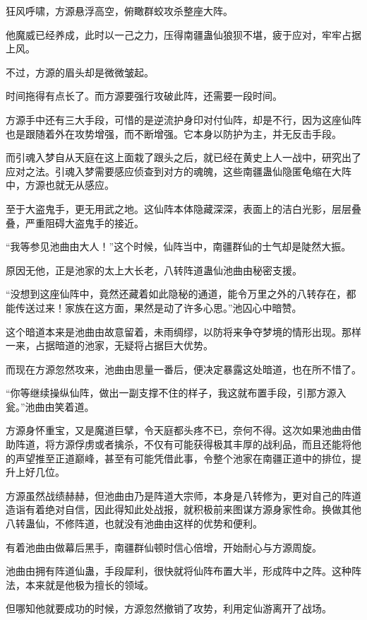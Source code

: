 \begin{this_body}
狂风呼啸，方源悬浮高空，俯瞰群蛟攻杀整座大阵。

他魔威已经养成，此时以一己之力，压得南疆蛊仙狼狈不堪，疲于应对，牢牢占据上风。

不过，方源的眉头却是微微皱起。

时间拖得有点长了。而方源要强行攻破此阵，还需要一段时间。

方源手中还有三大手段，可惜的是逆流护身印对付仙阵，却是不行，因为这座仙阵也是跟随着外在攻势增强，而不断增强。它本身以防护为主，并无反击手段。

而引魂入梦自从天庭在这上面栽了跟头之后，就已经在黄史上人一战中，研究出了应对之法。引魂入梦需要感应侦查到对方的魂魄，这些南疆蛊仙隐匿龟缩在大阵中，方源也就无从感应。

至于大盗鬼手，更无用武之地。这仙阵本体隐藏深深，表面上的洁白光影，层层叠叠，严重阻碍大盗鬼手的接近。

“我等参见池曲由大人！”这个时候，仙阵当中，南疆群仙的士气却是陡然大振。

原因无他，正是池家的太上大长老，八转阵道蛊仙池曲由秘密支援。

“没想到这座仙阵中，竟然还藏着如此隐秘的通道，能令万里之外的八转存在，都能传送过来！家族在这方面，果然是动了许多心思。”池囚心中暗赞。

这个暗道本来是池曲由故意留着，未雨绸缪，以防将来争夺梦境的情形出现。那样一来，占据暗道的池家，无疑将占据巨大优势。

而现在方源忽然攻来，池曲由思量一番后，便决定暴露这处暗道，也在所不惜了。

“你等继续操纵仙阵，做出一副支撑不住的样子，我这就布置手段，引那方源入瓮。”池曲由笑着道。

方源身怀重宝，又是魔道巨擘，令天庭都头疼不已，奈何不得。这次如果池曲由借助阵道，将方源俘虏或者擒杀，不仅有可能获得极其丰厚的战利品，而且还能将他的声望推至正道巅峰，甚至有可能凭借此事，令整个池家在南疆正道中的排位，提升上好几位。

方源虽然战绩赫赫，但池曲由乃是阵道大宗师，本身是八转修为，更对自己的阵道造诣有着绝对自信，因此得知此处战报，就积极前来图谋方源身家性命。换做其他八转蛊仙，不修阵道，也就没有池曲由这样的优势和便利。

有着池曲由做幕后黑手，南疆群仙顿时信心倍增，开始耐心与方源周旋。

池曲由拥有阵道仙蛊，手段犀利，很快就将仙阵布置大半，形成阵中之阵。这种阵法，本来就是他极为擅长的领域。

但哪知他就要成功的时候，方源忽然撤销了攻势，利用定仙游离开了战场。


\end{this_body}
